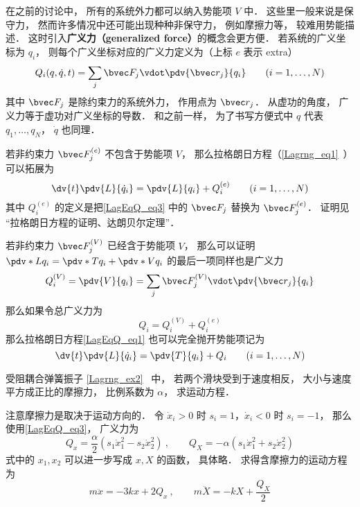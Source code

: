 

在之前的讨论中， 所有的系统外力都可以纳入势能项 $V$ 中． 这些里一般来说是保守力， 然而许多情况中还可能出现种种非保守力， 例如摩擦力等， 较难用势能描述． 这时引入\textbf{广义力（generalized force）}的概念会更方便． 若系统的广义坐标为 $q_i$， 则每个广义坐标对应的广义力定义为（上标 $e$ 表示 extra）
\begin{equation}\label{LagEqQ_eq3}
Q_i(q, \dot q, t) = \sum_j \bvec F_j \vdot \pdv{\bvec r_j}{q_i} \qquad (i=1,\dots,N)
\end{equation}
其中 $\bvec F_j$ 是除约束力的系统外力， 作用点为 $\bvec r_j$． 从虚功的角度， 广义力等于虚功对广义坐标的导数． 和之前一样， 为了书写方便式中 $q$ 代表 $q_1, \dots, q_N$， $\dot q$ 也同理．

若非约束力 $\bvec F_j^{(e)}$ 不包含于势能项 $V$， 那么拉格朗日方程（\autoref{Lagrng_eq1}~）可以拓展为
\begin{equation}\label{LagEqQ_eq1}
\dv{t} \pdv{L}{\dot q_i} = \pdv{L}{q_i} + Q_i^{(e)}
\qquad (i=1,\dots,N)
\end{equation}
其中 $Q_i^{(e)}$ 的定义是把\autoref{LagEqQ_eq3} 中的 $\bvec F_j$ 替换为 $\bvec F_j^{(e)}$． 证明见 “拉格朗日方程的证明、达朗贝尔定理”．

若非约束力 $\bvec F_j^{(V)}$ 已经含于势能项 $V$， 那么可以证明 $\pdv*{L}{q_i} = \pdv*{T}{q_i} + \pdv*{V}{q_i}$ 的最后一项同样也是广义力
\begin{equation}
Q_i^{(V)} = \pdv{V}{q_i} = \sum_j \bvec F_j^{(V)} \vdot \pdv{\bvec r_j}{q_i}
\end{equation}
那么如果令总广义力为
\begin{equation}
Q_i = Q_i^{(V)} + Q_i^{(e)}
\end{equation}
那么拉格朗日方程\autoref{LagEqQ_eq1} 也可以完全抛开势能项记为
\begin{equation}\label{LagEqQ_eq2}
\dv{t} \pdv{L}{\dot q_i} = \pdv{T}{q_i} + Q_i
\qquad (i=1,\dots,N)
\end{equation}

\begin{example}{受阻耦合弹簧振子}
\autoref{Lagrng_ex2}~ 中， 若两个滑块受到于速度相反， 大小与速度平方成正比的摩擦力， 比例系数为 $\alpha$， 求运动方程．

注意摩擦力是取决于运动方向的． 令 $\dot x_i > 0$ 时 $s_i = 1$，$\dot x_i < 0$ 时 $s_i = -1$， 那么使用\autoref{LagEqQ_eq3}， 广义力为
\begin{equation}
Q_x = \frac{\alpha}{2}(s_1\dot x_1^2 - s_2 \dot x_2^2)~, \qquad
Q_X = -\alpha(s_1 \dot x_1^2 + s_2\dot x_2^2)
\end{equation}
式中的 $x_1,x_2$ 可以进一步写成 $x, X$ 的函数， 具体略． 求得含摩擦力的运动方程为
\begin{equation}
m\ddot x =  - 3kx + 2Q_x~, \qquad
m\ddot X =  - kX + \frac{Q_X}{2}
\end{equation}
\end{example}
